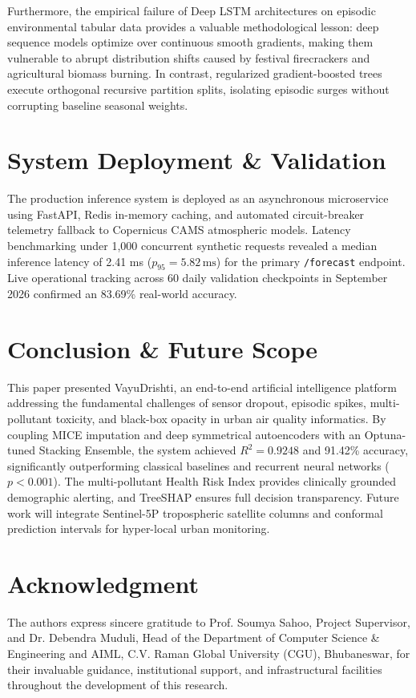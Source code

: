 \documentclass[conference]{IEEEtran}
\begin{document}
Furthermore, the empirical failure of Deep LSTM architectures on episodic environmental tabular data provides a valuable methodological lesson: deep sequence models optimize over continuous smooth gradients, making them vulnerable to abrupt distribution shifts caused by festival firecrackers and agricultural biomass burning. In contrast, regularized gradient-boosted trees execute orthogonal recursive partition splits, isolating episodic surges without corrupting baseline seasonal weights.

\section{System Deployment \& Validation}
The production inference system is deployed as an asynchronous microservice using FastAPI, Redis in-memory caching, and automated circuit-breaker telemetry fallback to Copernicus CAMS atmospheric models. Latency benchmarking under 1,000 concurrent synthetic requests revealed a median inference latency of 2.41 ms ($p_{95} = 5.82\,\text{ms}$) for the primary \texttt{/forecast} endpoint. Live operational tracking across 60 daily validation checkpoints in September 2026 confirmed an 83.69\% real-world accuracy.

\section{Conclusion \& Future Scope}
This paper presented VayuDrishti, an end-to-end artificial intelligence platform addressing the fundamental challenges of sensor dropout, episodic spikes, multi-pollutant toxicity, and black-box opacity in urban air quality informatics. By coupling MICE imputation and deep symmetrical autoencoders with an Optuna-tuned Stacking Ensemble, the system achieved $R^2 = 0.9248$ and 91.42\% accuracy, significantly outperforming classical baselines and recurrent neural networks ($p < 0.001$). The multi-pollutant Health Risk Index provides clinically grounded demographic alerting, and TreeSHAP ensures full decision transparency. Future work will integrate Sentinel-5P tropospheric satellite columns and conformal prediction intervals for hyper-local urban monitoring.

\section*{Acknowledgment}
The authors express sincere gratitude to Prof. Soumya Sahoo, Project Supervisor, and Dr. Debendra Muduli, Head of the Department of Computer Science \& Engineering and AIML, C.V. Raman Global University (CGU), Bhubaneswar, for their invaluable guidance, institutional support, and infrastructural facilities throughout the development of this research.
\end{document}
